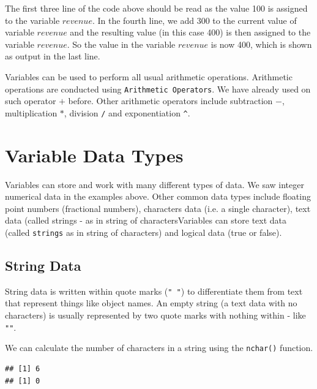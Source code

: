 \documentclass[11pt, letterpaper, twoside]{memoir}\usepackage{knitr}
\begin{document}
The first three line of the code above should be read as the value 100 is assigned to the variable $revenue$. In the fourth line, we add 300 to the current value of variable $revenue$ and the resulting value (in this case 400) is then assigned to the variable $revenue$. So the value in the variable $revenue$ is now 400, which is shown as output in the last line.

Variables can be used to perform all usual arithmetic operations. Arithmetic operations are conducted using \verb|Arithmetic Operators|. We have already used on such operator $+$ before. Other arithmetic operators include subtraction $-$, multiplication $*$, division \verb|/| and exponentiation \verb|^|.

\section{Variable Data Types}

Variables can store and work with many different types of data. We saw integer numerical data in the examples above. Other common data types include floating point numbers (fractional numbers), characters data (i.e. a single character), text data (called strings - as in string of charactersVariables can store text data (called \texttt{strings} as in string of characters) and logical data (true or false).

\subsection{String Data}

String data is written within quote marks (\texttt{" "}) to differentiate them from text that represent things like object names. An empty string (a text data with no characters) is usually represented by two quote marks with nothing within - like \texttt{""}.

\begin{knitrout}
\color{fgcolor}\begin{kframe}
\begin{alltt}
 \hlkwb{<-}  
 \hlkwb{<-}  
\end{alltt}
\end{kframe}
\end{knitrout}

We can calculate the number of characters in a string using the \texttt{nchar()} function. 
\begin{knitrout}
\color{fgcolor}\begin{kframe}
\begin{alltt}
 
\end{alltt}
\begin{verbatim}
## [1] 6
## [1] 0
\end{verbatim}
\end{kframe}
\end{knitrout}
\end{document}
